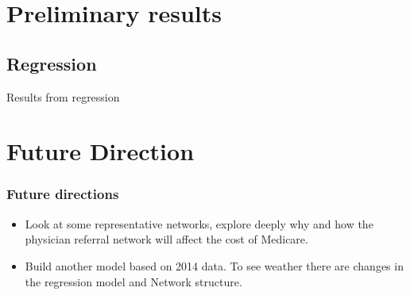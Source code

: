 \documentclass{beamer}
\begin{document}
\section{Preliminary results}
\subsection{Regression}

\begin{frame}{Results from regression}


\end{frame}


\section{Future Direction}
\begin{frame}
\frametitle{Future directions}
\begin{itemize}
\item Look at some representative networks, explore deeply why and how the physician referral network will affect the cost of Medicare.
\item Build another model based on 2014 data. To see weather there are changes in the regression model and Network  structure.
\end{itemize}

\end{frame}
\end{document}
